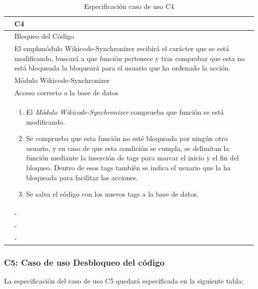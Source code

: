 \begin{table}[h]
\centering
\begin{tabular}{ | p{} | p{} | }
	\hline
	\cellcolor[gray]{.8}{ID} & C4 \\
	\hline 
	\cellcolor[gray]{.8}{Nombre} &  Bloqueo del Código\\
	\hline
	\cellcolor[gray]{.8}{Descripción} &  El emph{módulo Wikicode-Synchronizer} recibirá el carácter que se está modificando, buscará a que función pertenece y tras comprobar que esta no está bloqueada la bloqueará para el usuario que ha ordenado la acción.\\
	\hline
	\cellcolor[gray]{.8}{Actores} & Módulo Wikicode-Synchronizer \\
	\hline
	\cellcolor[gray]{.8}{Asunciones} & Acceso correcto a la base de datos \\
	\hline
	\cellcolor[gray]{.8}{Pasos} & \begin{enumerate}
		\item El \emph{Módulo Wikicode-Synchronizer} comprueba que función se está modificando.
		\item Se comprueba que esta función no esté bloqueada por ningún otro usuario, y en caso de que esta condición se cumpla, se delimitan la función mediante la inserción de tags para marcar el inicio y el fin del bloqueo. Dentro de esos tags también se indica el usuario que la ha bloqueada para facilitar las acciones.
		\item Se salva el código con los nuevos tags a la base de datos.
		\end{enumerate} \\
	\hline
	\cellcolor[gray]{.8}{Variaciones} & - \\
	\hline
	\cellcolor[gray]{.8}{Requisitos no funcionales} & - \\
	\hline
	\cellcolor[gray]{.8}{Cuestiones} & - \\
	\hline
	
\end{tabular}
\caption{Especificación caso de uso C4}
\end{table}

\newpage
\subsubsection{C5: Caso de uso Desbloqueo del código}

La especificación del caso de uso C5 quedará especificada en la siguiente tabla:

